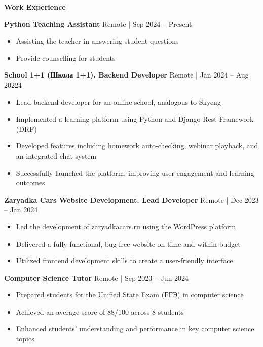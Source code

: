 \begin{center}
    \textbf{Work Experience}
\end{center}

\textbf{Python Teaching Assistant} \hfill Remote | Sep 2024 – Present
\begin{itemize}[noitemsep, topsep=0pt, partopsep=0pt, parsep=0pt]
    \item Assisting the teacher in answering student questions
    \item Provide counselling for students
\end{itemize}

\textbf{School 1+1 (Школа 1+1). Backend Developer} \hfill Remote | Jan 2024 – Aug 20224
\begin{itemize}[noitemsep, topsep=0pt, partopsep=0pt, parsep=0pt]
    \item Lead backend developer for an online school, analogous to Skyeng
    \item Implemented a learning platform using Python and Django Rest Framework (DRF)
    \item Developed features including homework auto-checking, webinar playback, and an integrated chat system
    \item Successfully launched the platform, improving user engagement and learning outcomes
\end{itemize}

\textbf{Zaryadka Cars Website Development. Lead Developer} \hfill Remote | Dec 2023 – Jan 2024
\begin{itemize}[noitemsep, topsep=0pt, partopsep=0pt, parsep=0pt]
    \item Led the development of \href{https://zaryadkacars.ru}{zaryadkacars.ru} using the WordPress platform
    \item Delivered a fully functional, bug-free website on time and within budget
    \item Utilized frontend development skills to create a user-friendly interface
\end{itemize}

\textbf{Computer Science Tutor} \hfill Remote | Sep 2023 – Jun 2024
\begin{itemize}[noitemsep, topsep=0pt, partopsep=0pt, parsep=0pt]
    \item Prepared students for the Unified State Exam (ЕГЭ) in computer science
    \item Achieved an average score of 88/100 across 8 students
    \item Enhanced students' understanding and performance in key computer science topics
\end{itemize}